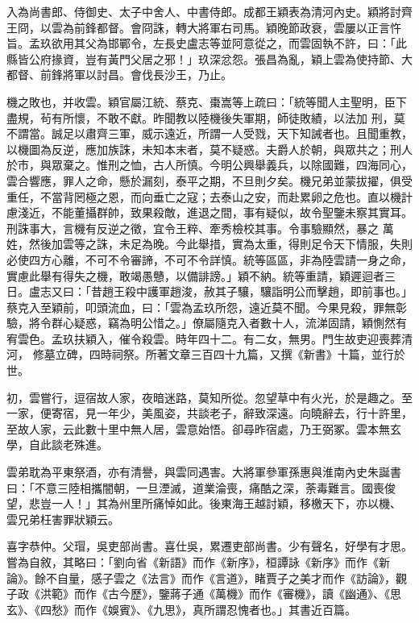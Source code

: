 \begin{pinyinscope}
 入為尚書郎、侍御史、太子中舍人、中書侍郎。成都王穎表為清河內史。穎將討齊王冏，以雲為前鋒都督。會冏誅，轉大將軍右司馬。穎晚節政衰，雲屢以正言忤旨。孟玖欲用其父為邯鄲令，左長史盧志等並阿意從之，而雲固執不許，曰：「此縣皆公府掾資，豈有黃門父居之邪！」玖深忿怨。張昌為亂，穎上雲為使持節、大都督、前鋒將軍以討昌。會伐長沙王，乃止。



 機之敗也，并收雲。穎官屬江統、蔡克、棗嵩等上疏曰：「統等聞人主聖明，臣下盡規，茍有所懷，不敢不獻。昨聞教以陸機後失軍期，師徒敗績，以法加
 刑，莫不謂當。誠足以肅齊三軍，威示遠近，所謂一人受戮，天下知誡者也。且聞重教，以機圖為反逆，應加族誅，未知本末者，莫不疑惑。夫爵人於朝，與眾共之；刑人於市，與眾棄之。惟刑之恤，古人所慎。今明公興舉義兵，以除國難，四海同心，雲合響應，罪人之命，懸於漏刻，泰平之期，不旦則夕矣。機兄弟並蒙拔擢，俱受重任，不當背罔極之恩，而向垂亡之寇；去泰山之安，而赴累卵之危也。直以機計慮淺近，不能董攝群帥，致果殺敵，進退之間，事有疑似，故令聖鑒未察其實耳。刑誅事大，言機有反逆之徵，宜令王粹、牽秀檢校其事。令事驗顯然，暴之
 萬姓，然後加雲等之誅，未足為晚。今此舉措，實為太重，得則足令天下情服，失則必使四方心離，不可不令審諦，不可不令詳慎。統等區區，非為陸雲請一身之命，實慮此舉有得失之機，敢竭愚戇，以備誹謗。」穎不納。統等重請，穎遲迴者三日。盧志又曰：「昔趙王殺中護軍趙浚，赦其子驤，驤詣明公而擊趙，即前事也。」蔡克入至穎前，叩頭流血，曰：「雲為孟玖所怨，遠近莫不聞。今果見殺，罪無彰驗，將令群心疑惑，竊為明公惜之。」僚屬隨克入者數十人，流涕固請，穎惻然有宥雲色。孟玖扶穎入，催令殺雲。時年四十二。有二女，無男。門生故吏迎喪葬清河，
 修墓立碑，四時祠祭。所著文章三百四十九篇，又撰《新書》十篇，並行於世。



 初，雲嘗行，逗宿故人家，夜暗迷路，莫知所從。忽望草中有火光，於是趣之。至一家，便寄宿，見一年少，美風姿，共談老子，辭致深遠。向曉辭去，行十許里，至故人家，云此數十里中無人居，雲意始悟。卻尋昨宿處，乃王弼冢。雲本無玄學，自此談老殊進。



 雲弟耽為平東祭酒，亦有清譽，與雲同遇害。大將軍參軍孫惠與淮南內史朱誕書曰：「不意三陸相攜闇朝，一旦湮滅，道業淪喪，痛酷之深，荼毒難言。國喪俊望，悲豈一人！」其為州里所痛悼如此。後東海王越討穎，移檄天下，亦以機、
 雲兄弟枉害罪狀穎云。



 喜字恭仲。父瑁，吳吏部尚書。喜仕吳，累遷吏部尚書。少有聲名，好學有才思。嘗為自敘，其略曰：「劉向省《新語》而作《新序》，桓譚詠《新序》而作《新論》。餘不自量，感子雲之《法言》而作《言道》，睹賈子之美才而作《訪論》，觀子政《洪範》而作《古今歷》，鑒蔣子通《萬機》而作《審機》，讀《幽通》、《思玄》、《四愁》而作《娛賓》、《九思》，真所謂忍愧者也。」其書近百篇。




\end{pinyinscope}
